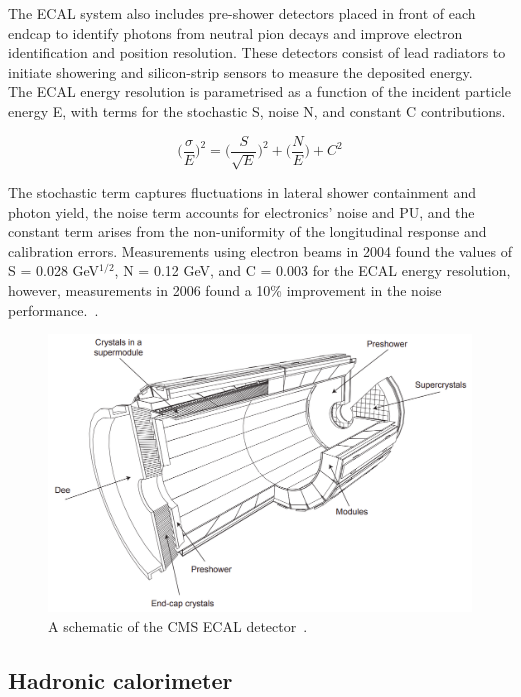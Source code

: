 The \ac{ECAL} system also includes pre-shower detectors placed in front of each endcap to identify photons from neutral pion decays and improve electron identification and position resolution. 
These detectors consist of lead radiators to initiate showering and silicon-strip sensors to measure the deposited energy. \\

The \ac{ECAL} energy resolution is parametrised as a function of the incident particle energy E, with terms for the stochastic S, noise N, and constant C contributions.

\begin{equation}
\Big(\frac{\sigma}{E}\Big)^2 = \Big(\frac{S}{\sqrt{E}}\Big)^2 + \Big( \frac{N}{E} \Big) + C^2
\end{equation}

The stochastic term captures fluctuations in lateral shower containment and photon yield, the noise term accounts for electronics' noise and \ac{PU}, and the constant term arises from the non-uniformity of the longitudinal response and calibration errors. 
Measurements using electron beams in 2004 found the values of S = 0.028 GeV$^{1/2}$, N = 0.12 GeV, and C = 0.003 for the \ac{ECAL} energy resolution, however, measurements in 2006 found a 10\% improvement in the noise performance.~\cite{CMS_Setup}.

\begin{figure}[!hbtp]
    \centering
    \includegraphics[width=\textwidth]{Figures/ECAL.png}
    \caption[Diagram of the CMS ECAL.]{A schematic of the CMS ECAL detector~\cite{CMS_Setup}.}
    \label{fig:ecal}
\end{figure}

\subsection{Hadronic calorimeter}

